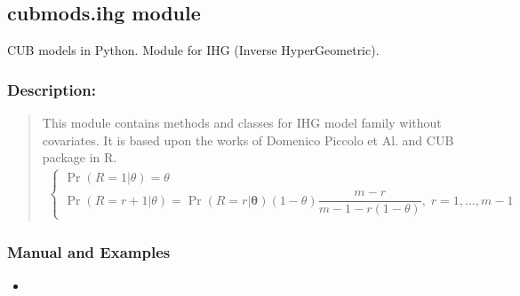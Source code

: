 \documentclass[letterpaper,10pt,english]{sphinxmanual}
\begin{document}
\subsection{cubmods.ihg module}
\label{\detokenize{cubmods:module-cubmods.ihg}}\label{\detokenize{cubmods:cubmods-ihg-module}}\label{\detokenize{cubmods:ihg0-module}}
\sphinxAtStartPar
CUB models in Python.
Module for IHG (Inverse HyperGeometric).


\subsubsection{Description:}
\label{\detokenize{cubmods:id719}}\begin{quote}

\sphinxAtStartPar
This module contains methods and classes
for IHG model family without covariates.
It is based upon the works of Domenico
Piccolo et Al. and CUB package in R.
\begin{equation*}
\begin{split}\left\{
\begin{array}{l}
    \Pr(R=1|\theta) = \theta
    \\
    \Pr(R=r+1|\theta) = \Pr(R=r|\pmb\theta)(1-\theta)\dfrac{m-r}{m-1-r(1-\theta)},\; r= 1, \ldots, m-1
\end{array}
\right.\end{split}
\end{equation*}\end{quote}


\subsubsection{Manual and Examples}
\label{\detokenize{cubmods:id720}}\begin{itemize}
\item {} 
\sphinxAtStartPar
{}

\end{itemize}
\end{document}
